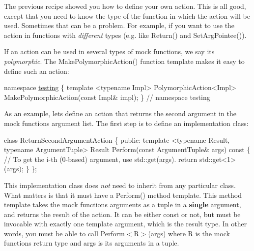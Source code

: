 The previous recipe showed you how to define your own action. This is all good, except that you need to know the type of the function in which the action will be used. Sometimes that can be a problem. For example, if you want to use the action in functions with {\itshape different} types (e.\+g. like {\ttfamily Return()} and {\ttfamily Set\+Arg\+Pointee()}).

If an action can be used in several types of mock functions, we say it\textquotesingle{}s {\itshape polymorphic}. The {\ttfamily Make\+Polymorphic\+Action()} function template makes it easy to define such an action\+:


\begin{DoxyCode}
\textcolor{keyword}{namespace }\mbox{\hyperlink{namespacetesting}{testing}} \{
\textcolor{keyword}{template} <\textcolor{keyword}{typename} Impl>
PolymorphicAction<Impl> MakePolymorphicAction(\textcolor{keyword}{const} Impl& impl);
\}  \textcolor{comment}{// namespace testing}
\end{DoxyCode}


As an example, let\textquotesingle{}s define an action that returns the second argument in the mock function\textquotesingle{}s argument list. The first step is to define an implementation class\+:


\begin{DoxyCode}
\textcolor{keyword}{class }ReturnSecondArgumentAction \{
 \textcolor{keyword}{public}:
  \textcolor{keyword}{template} <\textcolor{keyword}{typename} Result, \textcolor{keyword}{typename} ArgumentTuple>
  Result Perform(\textcolor{keyword}{const} ArgumentTuple& args)\textcolor{keyword}{ const }\{
    \textcolor{comment}{// To get the i-th (0-based) argument, use std::get(args).}
    \textcolor{keywordflow}{return} std::get<1>(args);
  \}
\};
\end{DoxyCode}


This implementation class does {\itshape not} need to inherit from any particular class. What matters is that it must have a {\ttfamily Perform()} method template. This method template takes the mock function\textquotesingle{}s arguments as a tuple in a {\bfseries single} argument, and returns the result of the action. It can be either {\ttfamily const} or not, but must be invocable with exactly one template argument, which is the result type. In other words, you must be able to call {\ttfamily Perform$<$R$>$(args)} where {\ttfamily R} is the mock function\textquotesingle{}s return type and {\ttfamily args} is its arguments in a tuple.

